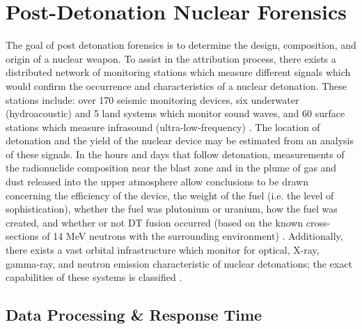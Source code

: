 \documentclass{report}
\begin{document}
\section{Post-Detonation Nuclear Forensics} \label{sec:post_det_forensics}


The goal of post detonation forensics is to determine the design, composition, and origin of a nuclear weapon. To assist in the attribution process, there exists a distributed network of monitoring stations which measure different signals which would confirm the occurrence and characteristics of a nuclear detonation. These stations include: over 170 seismic monitoring devices, six underwater (hydroacoustic) and 5 land systems which monitor sound waves, and 60 surface stations which measure infrasound (ultra-low-frequency) \cite{Lane2012}. The location of detonation and the yield of the nuclear device may be estimated from an analysis of these signals. In the hours and days that follow detonation, measurements of the radionuclide composition near the blast zone and in the plume of gas and dust released into the upper atmosphere allow conclusions to be drawn concerning the efficiency of the device, the weight of the fuel (i.e. the level of sophistication), whether the fuel was plutonium or uranium, how the fuel was created, and whether or not DT fusion occurred (based on the known cross-sections of 14 MeV neutrons with the surrounding environment) \cite{Davis2011}. Additionally, there exists a vast orbital infrastructure which monitor for optical, X-ray, gamma-ray, and neutron emission characteristic of nuclear detonations; the exact capabilities of these systems is classified \cite{1446400}. 

\subsection{Data Processing \& Response Time}
\end{document}
